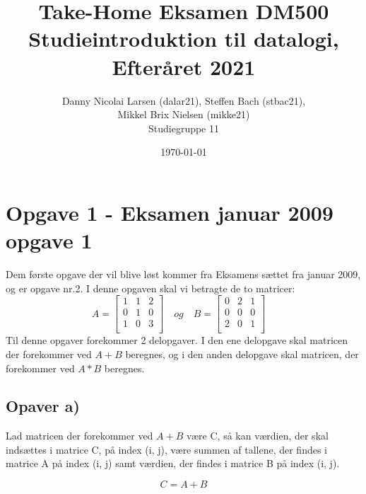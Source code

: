 \documentclass[20pt]{article}
\title{Take-Home Eksamen DM500 Studieintroduktion til datalogi, Efteråret 2021}
\author{Danny Nicolai Larsen (dalar21), Steffen Bach (stbac21),\\ Mikkel Brix Nielsen (mikke21) \\ Studiegruppe 11}
\date{\today}
\begin{document}
	\maketitle
	\newpage
	\section*{Opgave 1 - Eksamen januar 2009 opgave 1}
	Dem første opgave der vil blive løst kommer fra Eksamens sættet fra januar 2009, og er opgave nr.2.
	I denne opgaven skal vi betragte de to matricer:
	$$ 
	A = 
	\begin{bmatrix} 
		1 & 1 & 2 \\
		0 & 1 & 0 \\
		1 & 0 & 3 \\
	\end{bmatrix}
 	\quad og \quad B = 
	\begin{bmatrix} 
		0 & 2 & 1 \\
		0 & 0 & 0 \\
		2 & 0 & 1 \\
	\end{bmatrix}
	\quad
	$$
	Til denne opgaver forekommer 2 delopgaver. I den ene delopgave skal matricen der forekommer ved \(A+B\) beregnes, og i den anden delopgave skal matricen, der forekommer ved \(A*B\) beregnes.	
	
	\subsection*{Opaver a)}
	Lad matricen der forekommer ved \(A+B\) være C, så kan værdien, der skal indsættes i  matrice C, på index (i, j), være summen af tallene, der findes i matrice A på index (i, j) samt værdien, der findes i matrice B på index (i, j).
	
	\begin{equation}
		C = A+B
	\end{equation}
\end{document}
